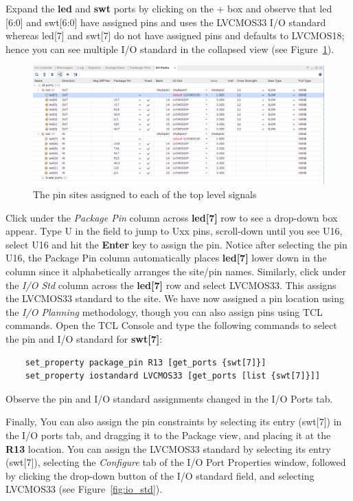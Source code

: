 \documentclass[11pt]{article}
\begin{document}
Expand the \textbf{led} and \textbf{swt} ports by clicking on the + box and observe that led [6:0] and swt[6:0] have assigned pins and uses the LVCMOS33 I/O standard whereas led[7] and swt[7] do not have assigned pins and defaults to LVCMOS18; hence you can see multiple I/O standard in the collapsed view (see Figure~\ref{fig:io_expand}). 

\begin{figure}[!h]
    \centering
    \includegraphics[width=\textwidth]{images/io_expand.png}
    \caption{The pin sites assigned to each of the top level signals}
    \label{fig:io_expand}
\end{figure}

Click under the \textit{Package Pin} column across \textbf{led[7]} row to see a drop-down box appear. Type U in the field to jump to Uxx pins, scroll-down until you see U16, select U16 and hit the \textbf{Enter} key to assign the pin. Notice after selecting the pin U16, the Package Pin column automatically places \textbf{led[7]} lower down in the column since it alphabetically arranges the site/pin names. Similarly, click under the \textit{I/O Std} column across the \textbf{led[7]} row and select LVCMOS33. This assigns the LVCMOS33 standard to the site. We have now assigned a pin location using the \textit{I/O Planning} methodology, though you can also assign pins using TCL commands. Open the TCL Console and type the following commands to select the pin and I/O standard for \textbf{swt[7]}:

\begin{verbatim}
    set_property package_pin R13 [get_ports {swt[7]}]
    set_property iostandard LVCMOS33 [get_ports [list {swt[7]}]]
\end{verbatim}

\noindent
Observe the pin and I/O standard assignments changed in the I/O Ports tab. 

Finally, You can also assign the pin constraints by selecting its entry (swt[7]) in the I/O ports tab, and dragging it to the Package view, and placing it at the \textbf{R13} location. You can assign the LVCMOS33 standard by selecting its entry (swt[7]), selecting the \textit{Configure} tab of the I/O Port Properties window, followed by clicking the drop-down button of the I/O standard field, and selecting LVCMOS33 (see Figure~\ref{fig:io_std}).
\end{document}
